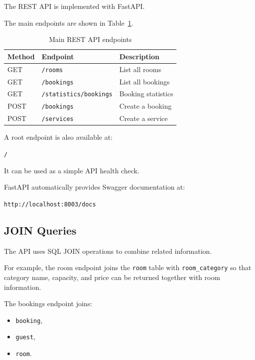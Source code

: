 \documentclass[12pt,a4paper]{article}
\begin{document}
The REST API is implemented with FastAPI.

The main endpoints are shown in Table~\ref{tab:endpoints}.

\begin{table}[h]
\centering
\begin{tabular}{lll}
\toprule
Method & Endpoint & Description \\
\midrule
GET & \texttt{/rooms} & List all rooms \\
GET & \texttt{/bookings} & List all bookings \\
GET & \texttt{/statistics/bookings} & Booking statistics \\
POST & \texttt{/bookings} & Create a booking \\
POST & \texttt{/services} & Create a service \\
\bottomrule
\end{tabular}
\caption{Main REST API endpoints}
\label{tab:endpoints}
\end{table}

A root endpoint is also available at:

\begin{center}
\texttt{/}
\end{center}

It can be used as a simple API health check.

FastAPI automatically provides Swagger documentation at:

\begin{center}
\texttt{http://localhost:8003/docs}
\end{center}

\subsection{JOIN Queries}

The API uses SQL JOIN operations to combine related information.

For example, the room endpoint joins the \texttt{room} table with
\texttt{room\_category} so that category name, capacity, and price can be
returned together with room information.

The bookings endpoint joins:

\begin{itemize}
    \item \texttt{booking},
    \item \texttt{guest},
    \item \texttt{room}.
\end{itemize}
\end{document}
